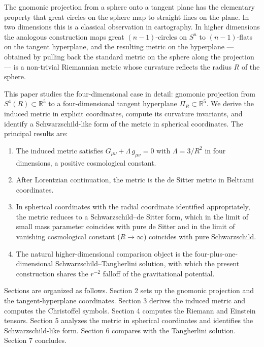 \documentclass[a4paper,11pt]{article}
\theoremstyle{definition}
\providecommand{\tightlist}{\setlength{\itemsep}{0pt}\setlength{\parskip}{0pt}}
\begin{document}
The gnomonic projection from a sphere onto a tangent plane has the
elementary property that great circles on the sphere map to straight
lines on the plane. In two dimensions this is a classical observation in
cartography. In higher dimensions the analogous construction maps great
\((n-1)\)-circles on \(S^n\) to \((n-1)\)-flats on the tangent
hyperplane, and the resulting metric on the hyperplane --- obtained by
pulling back the standard metric on the sphere along the projection ---
is a non-trivial Riemannian metric whose curvature reflects the radius
\(R\) of the sphere.

This paper studies the four-dimensional case in detail: gnomonic
projection from \(S^4(R) \subset \mathbb{R}^5\) to a four-dimensional
tangent hyperplane \(\Pi_R \subset \mathbb{R}^5\). We derive the induced
metric in explicit coordinates, compute its curvature invariants, and
identify a Schwarzschild-like form of the metric in spherical
coordinates. The principal results are:

\begin{enumerate}
\def\labelenumi{\arabic{enumi}.}
\tightlist
\item
  The induced metric satisfies \(G_{\mu\nu} + \Lambda\, g_{\mu\nu} = 0\)
  with \(\Lambda = 3/R^2\) in four dimensions, a positive cosmological
  constant.
\item
  After Lorentzian continuation, the metric is the de Sitter metric in
  Beltrami coordinates.
\item
  In spherical coordinates with the radial coordinate identified
  appropriately, the metric reduces to a Schwarzschild--de Sitter form,
  which in the limit of small mass parameter coincides with pure de
  Sitter and in the limit of vanishing cosmological constant
  (\(R \to \infty\)) coincides with pure Schwarzschild.
\item
  The natural higher-dimensional comparison object is the
  four-plus-one-dimensional Schwarzschild--Tangherlini solution, with
  which the present construction shares the \(r^{-2}\) falloff of the
  gravitational potential.
\end{enumerate}

Sections are organized as follows. Section 2 sets up the gnomonic
projection and the tangent-hyperplane coordinates. Section 3 derives the
induced metric and computes the Christoffel symbols. Section 4 computes
the Riemann and Einstein tensors. Section 5 analyzes the metric in
spherical coordinates and identifies the Schwarzschild-like form.
Section 6 compares with the Tangherlini solution. Section 7 concludes.
\end{document}
